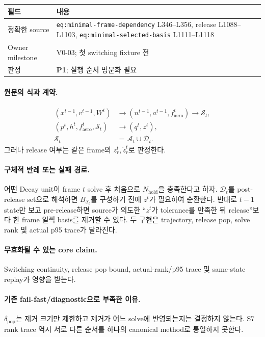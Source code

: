 \documentclass[11pt]{article}
\newcommand{\src}[1]{\textcolor{CoreBlue}{\nolinkurl{#1}}}
\newcommand{\pone}{\textcolor{WarnOrange}{\textbf{P1}}}
\begin{document}
\begin{tabularx}{\textwidth}{L{0.22\textwidth}Y}
\toprule
필드 & 내용 \\
\midrule
정확한 source & \src{eq:minimal-frame-dependency} L346--L356, release L1088--L1103, \src{eq:minimal-selected-basis} L1111--L1118 \\
Owner milestone & V0-03; 첫 switching fixture 전 \\
판정 & \pone; 실행 순서 명문화 필요 \\
\bottomrule
\end{tabularx}

\paragraph{원문의 식과 계약.}
\begin{equation}
\begin{aligned}
  (x^{t-1},v^{t-1},W^t)
  &\longrightarrow(n^{t-1},a^{t-1},f_{\mathrm{aero}}^t)
  \longrightarrow\mathcal S_t,\\
  (p^t,h^t,f_{\mathrm{aero}}^t,\mathcal S_t)
  &\longrightarrow(q^t,z^t),\\
  \mathcal S_t&=\mathcal A_t\cup\mathcal D_t.
\end{aligned}
\end{equation}
그러나 release 여부는 같은 frame의 $z_r^t,\dot z_r^t$로 판정한다.

\paragraph{구체적 반례 또는 실패 경로.}
어떤 Decay unit이 frame $t$ solve 후 처음으로 $N_{\mathrm{hold}}$을 충족한다고 하자.
$\mathcal D_t$를 post-release set으로 해석하면 $B_{\mathcal S_t}$를 구성하기 전에 $z^t$가 필요하여
순환한다. 반대로 $t-1$ state만 보고 pre-release하면 source가 의도한
``$z^t$가 tolerance를 만족한 뒤 release''보다 한 frame 일찍 basis를 제거할 수 있다.
두 구현은 trajectory, release pop, solve rank 및 actual p95 trace가 달라진다.

\paragraph{무효화될 수 있는 core claim.}
Switching continuity, release pop bound, actual-rank/p95 trace 및 same-state replay가 영향을 받는다.

\paragraph{기존 fail-fast/diagnostic으로 부족한 이유.}
$\delta_{\mathrm{pop}}$는 제거 크기만 제한하고 제거가 어느 solve에 반영되는지는 결정하지 않는다.
S7 rank trace 역시 서로 다른 순서를 하나의 canonical method로 통일하지 못한다.
\end{document}
